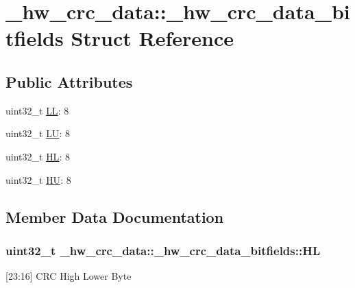 \hypertarget{struct__hw__crc__data_1_1__hw__crc__data__bitfields}{}\section{\+\_\+hw\+\_\+crc\+\_\+data\+:\+:\+\_\+hw\+\_\+crc\+\_\+data\+\_\+bitfields Struct Reference}
\label{struct__hw__crc__data_1_1__hw__crc__data__bitfields}
\subsection*{Public Attributes}
\begin{DoxyCompactItemize}
\item 
uint32\+\_\+t \hyperlink{struct__hw__crc__data_1_1__hw__crc__data__bitfields_a566374b91545fb28fcf368e423ae19d3}{LL}\+: 8
\item 
uint32\+\_\+t \hyperlink{struct__hw__crc__data_1_1__hw__crc__data__bitfields_a88ede13310999f00cf5a8250a2960e9e}{LU}\+: 8
\item 
uint32\+\_\+t \hyperlink{struct__hw__crc__data_1_1__hw__crc__data__bitfields_aa49cdc4cd090aabe3012703b26551dbd}{HL}\+: 8
\item 
uint32\+\_\+t \hyperlink{struct__hw__crc__data_1_1__hw__crc__data__bitfields_ad1c54e62d30d268ad1b012b06171ba45}{HU}\+: 8
\end{DoxyCompactItemize}


\subsection{Member Data Documentation}
\subsubsection[{\texorpdfstring{HL}{HL}}]{\setlength{\rightskip}{0pt plus 5cm}uint32\+\_\+t \+\_\+hw\+\_\+crc\+\_\+data\+::\+\_\+hw\+\_\+crc\+\_\+data\+\_\+bitfields\+::\+HL}\hypertarget{struct__hw__crc__data_1_1__hw__crc__data__bitfields_aa49cdc4cd090aabe3012703b26551dbd}{}\label{struct__hw__crc__data_1_1__hw__crc__data__bitfields_aa49cdc4cd090aabe3012703b26551dbd}
\mbox{[}23\+:16\mbox{]} C\+RC High Lower Byte 
